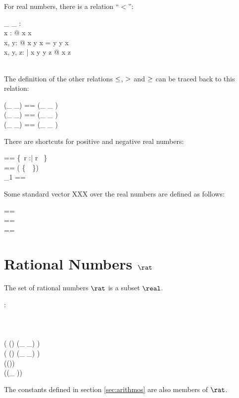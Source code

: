 \documentclass[12pt]{article}
\begin{document}
For real numbers, there is a relation ``$<$'':
%
\begin{axdef}
  \_ \alt \_ : \real \rel \real\\
  \where
  \forall x : \real @ \lnot x \alt x\\
  \forall x, y: \real @ x \alt y \lor x = y \lor y \alt x\\
  \forall x, y, z: \real | x \alt y \land y \alt z @ x \alt z \\
  \azero \alt \aone\\
\end{axdef}
%
The definition of the other relations $\leq$, $>$ and $\geq$ can
be traced back to this relation:
%
\begin{zed}
  (\_ \aleq \_) == (\_ \alt \_ ) \cup \id \real \\
  (\_ \agt \_) == (\_ \alt \_ ) \inv \\
  (\_ \ageq \_) == (\_ \agt \_ ) \cup \id \real \\
\end{zed}
%
There are shortcuts for positive and negative real numbers:
%
\begin{zed}
  \realplus == \{~r :\real | r \agt \azero~\}\\
  \realminus == \real \setminus ( \realplus \cup \{~\azero~\})\\
  \real_1 == \realplus \cup \realminus \\
\end{zed}
%
Some standard vector XXX over the real numbers are defined as follows:
\begin{zed}
  \realtwod == \real \cross \real \\
  \realthreed == \realtwod \cross \real \\
  \realfourd == \realthreed \cross \real \\
\end{zed}
%

\section{Rational Numbers $\rat$}
\label{sec:rational-numbers}
The set of rational numbers $\rat$ is a subset $\real$.
%
\begin{axdef}
  \rat : \power \real
  \where
  \azero \in \rat\\
  \aone \in \rat\\
  \atwo \in \rat\\
  \aten \in \rat\\
  \ran ( (\rat \cross \rat) \dres (\_ \aplus \_) ) \subset \rat\\
  \ran ( (\rat \cross \rat) \dres (\_ \amult \_) ) \subset \rat\\
  \ran (\rat \dres (\aneg ))  \subset \rat\\
  \ran (\rat \dres (\_ \ainv ))  \subset \rat\\
\end{axdef}
The constants defined in section \ref{sec:arithmos} are also members
of $\rat$.
\end{document}
